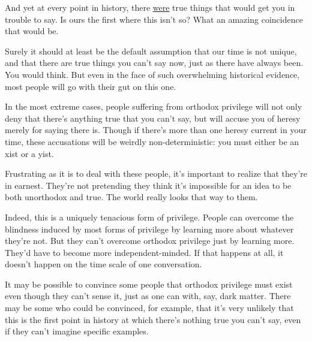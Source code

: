 And yet at every point in
                  history, there \href{http://www.paulgraham.com/say.html}{\underline{were}} true things
                  that would get you in trouble to say. Is ours the first where
                  this isn't so? What an amazing coincidence that would be.

Surely
                  it should at least be the default assumption that our time is
                  not unique, and that there are true things you can't say now,
                  just as there have always been. You would think. But even in
                  the face of such overwhelming historical evidence, most people
                  will go with their gut on this one.

In the most
                  extreme cases, people suffering from orthodox privilege will
                  not only deny that there's anything true that you can't say,
                  but will accuse you of heresy merely for saying there is.
                  Though if there's more than one heresy current in your time,
                  these accusations will be weirdly non-deterministic: you must
                  either be an xist or a yist.

Frustrating as it is
                  to deal with these people, it's important to realize that
                  they're in earnest. They're not pretending they think it's
                  impossible for an idea to be both unorthodox and true. The
                  world really looks that way to them.

Indeed, this
                  is a uniquely tenacious form of privilege. People can overcome
                  the blindness induced by most forms of privilege by learning
                  more about whatever they're not. But they can't overcome
                  orthodox privilege just by learning more. They'd have to
                  become more independent-minded. If that happens at all, it
                  doesn't happen on the time scale of one conversation.

It
                  may be possible to convince some people that orthodox
                  privilege must exist even though they can't sense it, just as
                  one can with, say, dark matter. There may be some who could be
                  convinced, for example, that it's very unlikely that this is
                  the first point in history at which there's nothing true you
                  can't say, even if they can't imagine specific examples.

